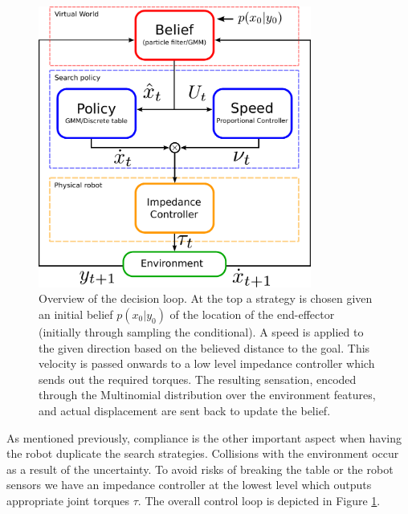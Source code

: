 \begin{figure}
\centering
  \includegraphics[width=0.8\textwidth]{./ch3-Search/Figures/Control_schematics}
  \caption{Overview of the decision loop. At the top a strategy is chosen given an initial belief
$p(x_{0}|y_{0})$ of the location of the end-effector (initially through sampling the conditional). 
A speed is applied to the given direction based on the believed distance
to the goal. This velocity is passed onwards to
a low level impedance controller which sends out the required torques. The
resulting sensation, encoded through the Multinomial distribution over
  the environment features, and actual displacement are sent back to update the
belief.}
  \label{fig:flow_chart}
\end{figure}

%
%
As mentioned previously, compliance is the other important aspect when having the robot duplicate the search strategies. 
Collisions with the environment occur as a result of the uncertainty. To avoid risks of breaking the table or the robot sensors we have an impedance controller
at the lowest level which outputs appropriate joint torques $\tau$. The overall control loop is depicted in Figure \ref{fig:flow_chart}.



\FloatBarrier
